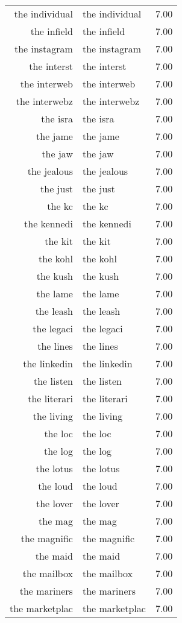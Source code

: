 \begin{table}[ht]
\begin{tabular}{rlr}
  the individual & the individual & 7.00 \\ 
  the infield & the infield & 7.00 \\ 
  the instagram & the instagram & 7.00 \\ 
  the interst & the interst & 7.00 \\ 
  the interweb & the interweb & 7.00 \\ 
  the interwebz & the interwebz & 7.00 \\ 
  the isra & the isra & 7.00 \\ 
  the jame & the jame & 7.00 \\ 
  the jaw & the jaw & 7.00 \\ 
  the jealous & the jealous & 7.00 \\ 
  the just & the just & 7.00 \\ 
  the kc & the kc & 7.00 \\ 
  the kennedi & the kennedi & 7.00 \\ 
  the kit & the kit & 7.00 \\ 
  the kohl & the kohl & 7.00 \\ 
  the kush & the kush & 7.00 \\ 
  the lame & the lame & 7.00 \\ 
  the leash & the leash & 7.00 \\ 
  the legaci & the legaci & 7.00 \\ 
  the lines & the lines & 7.00 \\ 
  the linkedin & the linkedin & 7.00 \\ 
  the listen & the listen & 7.00 \\ 
  the literari & the literari & 7.00 \\ 
  the living & the living & 7.00 \\ 
  the loc & the loc & 7.00 \\ 
  the log & the log & 7.00 \\ 
  the lotus & the lotus & 7.00 \\ 
  the loud & the loud & 7.00 \\ 
  the lover & the lover & 7.00 \\ 
  the mag & the mag & 7.00 \\ 
  the magnific & the magnific & 7.00 \\ 
  the maid & the maid & 7.00 \\ 
  the mailbox & the mailbox & 7.00 \\ 
  the mariners & the mariners & 7.00 \\ 
  the marketplac & the marketplac & 7.00 \\ 

\end{tabular}
\end{table}
